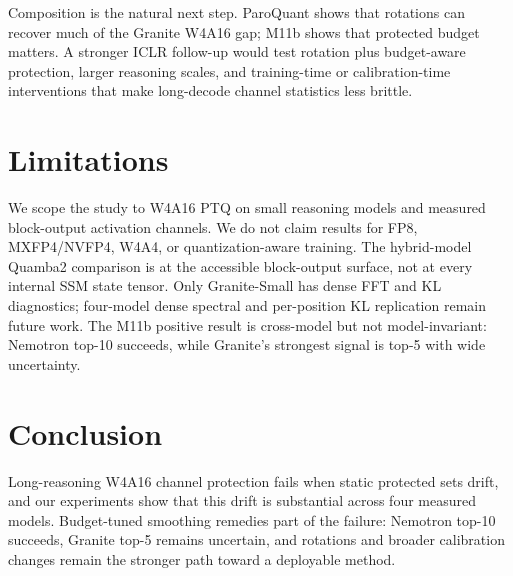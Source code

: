 \documentclass{article}
\begin{document}
Composition is the natural next step. ParoQuant shows that rotations can recover much of the Granite W4A16 gap; M11b shows that protected budget matters. A stronger ICLR follow-up would test rotation plus budget-aware protection, larger reasoning scales, and training-time or calibration-time interventions that make long-decode channel statistics less brittle.

\section{Limitations}

We scope the study to W4A16 PTQ on small reasoning models and measured block-output activation channels. We do not claim results for FP8, MXFP4/NVFP4, W4A4, or quantization-aware training. The hybrid-model Quamba2 comparison is at the accessible block-output surface, not at every internal SSM state tensor. Only Granite-Small has dense FFT and KL diagnostics; four-model dense spectral and per-position KL replication remain future work. The M11b positive result is cross-model but not model-invariant: Nemotron top-10 succeeds, while Granite's strongest signal is top-5 with wide uncertainty.

\section{Conclusion}

Long-reasoning W4A16 channel protection fails when static protected sets drift, and our experiments show that this drift is substantial across four measured models. Budget-tuned smoothing remedies part of the failure: Nemotron top-10 succeeds, Granite top-5 remains uncertain, and rotations and broader calibration changes remain the stronger path toward a deployable method.
\end{document}
